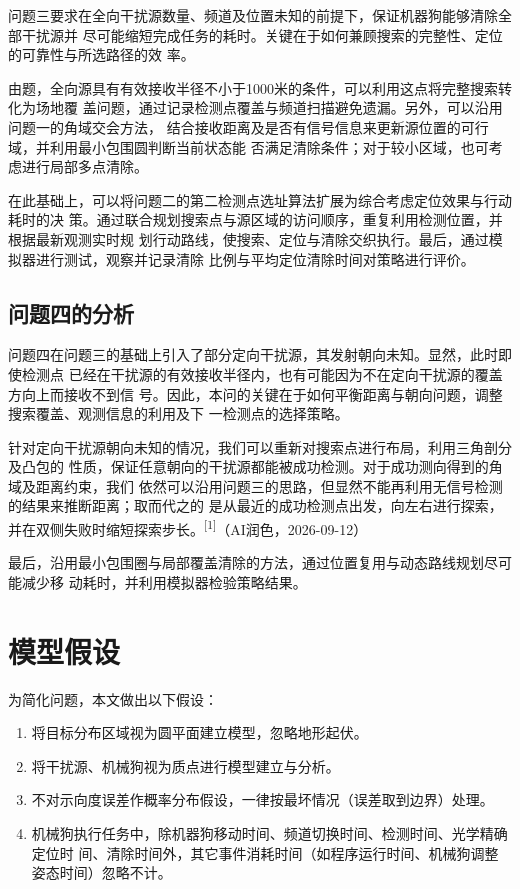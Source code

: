 \documentclass[withoutpreface,bwprint]{cumcmthesis} %
\begin{document}
问题三要求在全向干扰源数量、频道及位置未知的前提下，保证机器狗能够清除全部干扰源并
尽可能缩短完成任务的耗时。关键在于如何兼顾搜索的完整性、定位的可靠性与所选路径的效
率。

由题，全向源具有有效接收半径不小于1000米的条件，可以利用这点将完整搜索转化为场地覆
盖问题，通过记录检测点覆盖与频道扫描避免遗漏。另外，可以沿用问题一的角域交会方法，
结合接收距离及是否有信号信息来更新源位置的可行域，并利用最小包围圆判断当前状态能
否满足清除条件；对于较小区域，也可考虑进行局部多点清除。

在此基础上，可以将问题二的第二检测点选址算法扩展为综合考虑定位效果与行动耗时的决
策。通过联合规划搜索点与源区域的访问顺序，重复利用检测位置，并根据最新观测实时规
划行动路线，使搜索、定位与清除交织执行。最后，通过模拟器进行测试，观察并记录清除
比例与平均定位清除时间对策略进行评价。

\subsection{问题四的分析}

问题四在问题三的基础上引入了部分定向干扰源，其发射朝向未知。显然，此时即使检测点
已经在干扰源的有效接收半径内，也有可能因为不在定向干扰源的覆盖方向上而接收不到信
号。因此，本问的关键在于如何平衡距离与朝向问题，调整搜索覆盖、观测信息的利用及下
一检测点的选择策略。

针对定向干扰源朝向未知的情况，我们可以重新对搜索点进行布局，利用三角剖分及凸包的
性质，保证任意朝向的干扰源都能被成功检测。对于成功测向得到的角域及距离约束，我们
依然可以沿用问题三的思路，但显然不能再利用无信号检测的结果来推断距离；取而代之的
是从最近的成功检测点出发，向左右进行探索，并在双侧失败时缩短探索步长。\textsuperscript{[1]}（AI润色，2026-09-12）

最后，沿用最小包围圈与局部覆盖清除的方法，通过位置复用与动态路线规划尽可能减少移
动耗时，并利用模拟器检验策略结果。

\section{模型假设}

为简化问题，本文做出以下假设：

\begin{enumerate}[leftmargin=1.3cm]
    \item 将目标分布区域视为圆平面建立模型，忽略地形起伏。
    \item 将干扰源、机械狗视为质点进行模型建立与分析。
    \item 不对示向度误差作概率分布假设，一律按最坏情况（误差取到边界）处理。
    \item 机械狗执行任务中，除机器狗移动时间、频道切换时间、检测时间、光学精确定位时
    间、清除时间外，其它事件消耗时间（如程序运行时间、机械狗调整姿态时间）忽略不计。
\end{enumerate}
\end{document}
